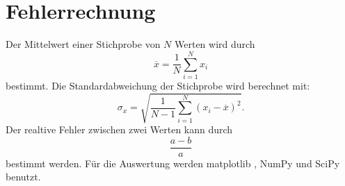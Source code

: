 \section{Fehlerrechnung}

Der Mittelwert einer Stichprobe von $N$ Werten wird durch
\begin{equation}
    \overline{x} = \frac{1}{N} \sum_{i=1}^N x_i
    \label{eqn:mittelwert}
\end{equation}
bestimmt.
\newline
Die Standardabweichung der Stichprobe wird berechnet mit:
\begin{equation*}
    \sigma_x = \sqrt{\frac{1}{N-1} \sum_{i=1}^N (x_i - \overline{x})^2}.
    \label{eqn:standard}
\end{equation*}
\newline
Der realtive Fehler zwischen zwei Werten kann durch
\begin{equation*}
    \frac{a-b}{a}
\end{equation*}
bestimmt werden.
\newline
Für die Auswertung werden matplotlib \cite{matplotlib}, NumPy \cite{numpy} und SciPy \cite{scipy} benutzt. %